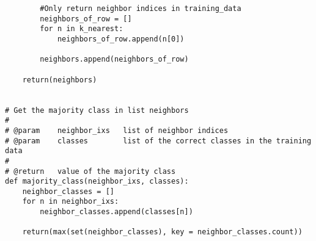 \documentclass[a4paper]{article}
\begin{document}
\begin{lstlisting}
        #Only return neighbor indices in training_data
        neighbors_of_row = []
        for n in k_nearest:
            neighbors_of_row.append(n[0])

        neighbors.append(neighbors_of_row)

    return(neighbors)


# Get the majority class in list neighbors
#
# @param    neighbor_ixs   list of neighbor indices
# @param    classes        list of the correct classes in the training data
#
# @return   value of the majority class 
def majority_class(neighbor_ixs, classes):
    neighbor_classes = []
    for n in neighbor_ixs:
        neighbor_classes.append(classes[n])
    
    return(max(set(neighbor_classes), key = neighbor_classes.count))
\end{lstlisting}
\end{document}
